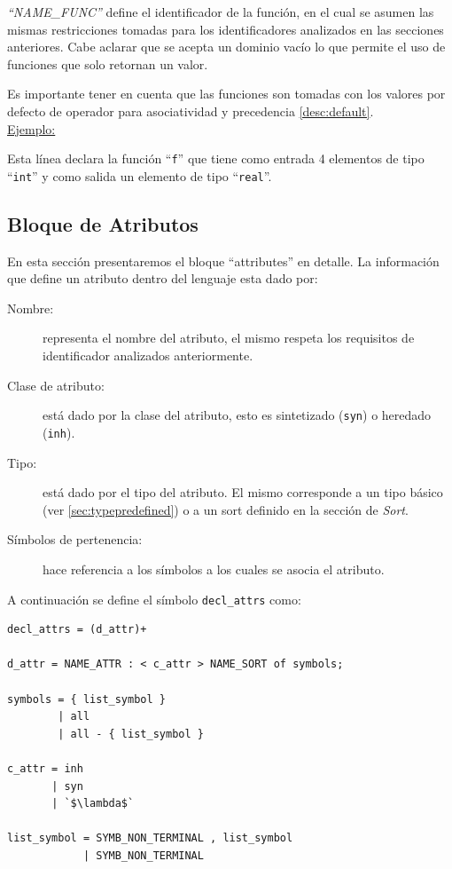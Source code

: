\textit{``NAME\_FUNC''} define el identificador de la función, en el cual se asumen las mismas restricciones tomadas para los identificadores analizados en las secciones anteriores. Cabe aclarar que se acepta un dominio vacío lo que permite el uso de funciones que solo retornan un valor.

Es importante tener en cuenta que las funciones son tomadas con los valores por defecto de operador para asociatividad y precedencia \ref{desc:default}.\\

\underline{Ejemplo:}\ \begin{center}
                                                                           \end{center}
\vspace{0.2cm}
Esta línea declara la función ``\texttt{f}'' que tiene como entrada 4 elementos de tipo ``\texttt{int}'' y como salida un elemento de tipo ``\texttt{real}''.

\subsection{Bloque de Atributos}
En esta sección presentaremos el bloque ``attributes'' en detalle. La información que define un atributo dentro del lenguaje esta dado por: 

\begin{description}
\item [Nombre:] representa el nombre del atributo, el mismo respeta los requisitos de identificador analizados anteriormente.

\item [Clase de atributo:] está dado por la clase del atributo, esto es sintetizado (\texttt{syn}) o heredado (\texttt{inh}).

\item [Tipo:] está dado por el tipo del atributo. El mismo corresponde a un tipo básico (ver \ref{sec:typepredefined}) o a un sort definido en la sección de \textit{Sort}.

\item [Símbolos de pertenencia:] hace referencia a los símbolos a los cuales se asocia el atributo.
\end{description}

A continuación se define el símbolo \texttt{decl\_attrs} como:

\vspace{0.3cm}
\begin{lstlisting}[frame=shadowbox, rulesepcolor=\color{azul}, language=specmag]
decl_attrs = (d_attr)+

d_attr = NAME_ATTR : < c_attr > NAME_SORT of symbols;

symbols = { list_symbol }
        | all
        | all - { list_symbol }

c_attr = inh
       | syn
       | `$\lambda$`

list_symbol = SYMB_NON_TERMINAL , list_symbol
            | SYMB_NON_TERMINAL 
\end{lstlisting}
\vspace{0.3cm}

